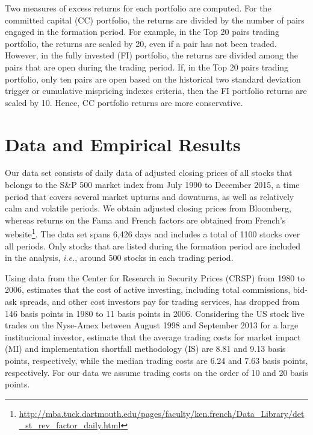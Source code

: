 \documentclass[a4paper]{article}
\begin{document}
	\vspace{0.3cm}

Two measures of excess returns for each portfolio are computed. 
For the committed capital (CC) portfolio,
the returns are divided by the number of pairs engaged in the 
formation period. For example, in the
Top 20 pairs trading portfolio, the returns are scaled by 20, even if a pair has not been traded. However, in
the fully invested (FI) portfolio, the
returns are divided among the pairs that are open during the 
trading period. If, in the Top 20
pairs trading portfolio, only ten pairs are open based on the historical two standard deviation trigger or cumulative mispricing indexes criteria, then the FI portfolio
returns are scaled by 10. Hence, CC portfolio returns are more conservative.


	\vspace{0.6cm}
	
	\section{Data and Empirical Results}
	
	Our data set consists of daily data of adjusted closing prices of all stocks that belongs to the S\&P 500 market index from July 1990 to December 2015, {\color{blue} a time period that covers several market upturns and downturns, as well as relatively calm and volatile periods.}  We obtain adjusted closing prices from Bloomberg, whereas returns on the Fama and French factors are obtained from French's website\footnote{\url{http://mba.tuck.dartmouth.edu/pages/faculty/ken.french/Data_Library/det_st_rev_factor_daily.html}}. The data set spans 6,426 days and includes a total of 1100 stocks over all periods. Only stocks that are listed during the formation period are included in the analysis, \emph{i.e.}, around 500 stocks in each trading period.
	
	
	Using data from the Center for Research in Security Prices (CRSP) from 1980 to 2006, \citet*{french2008} estimates that the cost of active investing, including total commissions, bid-ask spreads, and other cost investors pay for trading services, has dropped from 146 basis points in 1980 to 11 basis points in 2006. Considering the US stock live trades on the Nyse-Amex between August 1998 and September 2013 for a large institucional investor, \citet*{fim15} estimate that the average trading costs for market impact (MI) and implementation shortfall methodology (IS) are 8.81 and 9.13 basis points, respectively, while the median trading costs are 6.24 and 7.63 basis points, respectively. For our data we assume trading costs on the order of 10 and 20 basis points.
	
\end{document}
